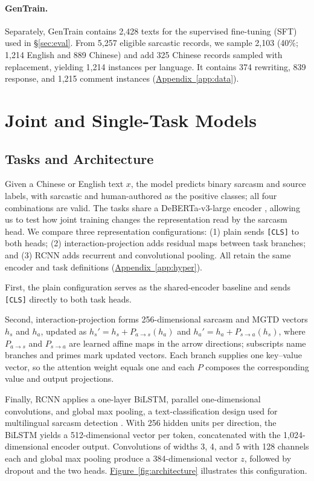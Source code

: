 \documentclass[11pt]{article}
\newcommand{\Sref}[1]{\hyperref[#1]{\S\ref*{#1}}}
\newcommand{\Appref}[1]{\hyperref[#1]{Appendix~\ref*{#1}}}
\newcommand{\Figref}[1]{\hyperref[#1]{Figure~\ref*{#1}}}
\begin{document}
\paragraph{GenTrain.} Separately, GenTrain contains 2{,}428 texts for the supervised fine-tuning (SFT) used in \Sref{sec:eval}. From 5{,}257 eligible sarcastic records, we sample 2{,}103 (40\%; 1{,}214 English and 889 Chinese) and add 325 Chinese records sampled with replacement, yielding 1{,}214 instances per language. It contains 374 rewriting, 839 response, and 1{,}215 comment instances (\Appref{app:data}).

\section{Joint and Single-Task Models}
\label{sec:model}

\subsection{Tasks and Architecture}
\label{sec:model-arch}

Given a Chinese or English text $x$, the model predicts binary sarcasm and source labels, with sarcastic and human-authored as the positive classes; all four combinations are valid. The tasks share a DeBERTa-v3-large encoder \citep{he2023debertav3}, allowing us to test how joint training changes the representation read by the sarcasm head. We compare three representation configurations: (1) plain sends \texttt{[CLS]} to both heads; (2) interaction-projection adds residual maps between task branches; and (3) RCNN adds recurrent and convolutional pooling. All retain the same encoder and task definitions (\Appref{app:hyper}).

First, the plain configuration serves as the shared-encoder baseline and sends \texttt{[CLS]} directly to both task heads.

Second, interaction-projection forms 256-dimensional sarcasm and MGTD vectors $h_s$ and $h_a$, updated as $h_s'=h_s+P_{a\rightarrow s}(h_a)$ and $h_a'=h_a+P_{s\rightarrow a}(h_s)$, where $P_{a\rightarrow s}$ and $P_{s\rightarrow a}$ are learned affine maps in the arrow directions; subscripts name branches and primes mark updated vectors. Each branch supplies one key--value vector, so the attention weight equals one and each $P$ composes the corresponding value and output projections.

Finally, RCNN applies a one-layer BiLSTM, parallel one-dimensional convolutions, and global max pooling, a text-classification design \citep{lai2015rcnn} used for multilingual sarcasm detection \citep{yang2024influence}. With 256 hidden units per direction, the BiLSTM yields a 512-dimensional vector per token, concatenated with the 1{,}024-dimensional encoder output. Convolutions of widths 3, 4, and 5 with 128 channels each and global max pooling produce a 384-dimensional vector $z$, followed by dropout and the two heads. \Figref{fig:architecture} illustrates this configuration.
\end{document}
